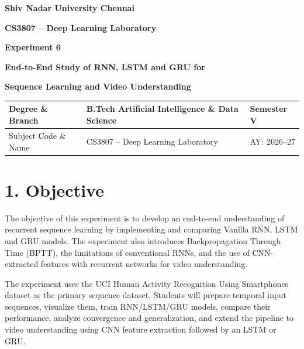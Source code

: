 \documentclass[10pt]{article}
\begin{document}

\begin{center}

{\large\textbf{Shiv Nadar University Chennai}}

\vspace{2mm}

{\normalsize\textbf{CS3807 -- Deep Learning Laboratory}}

\vspace{2mm}

{\large\textbf{Experiment 6}}

\vspace{1mm}

{\normalsize\textbf{End-to-End Study of RNN, LSTM and GRU for}}

{\normalsize\textbf{Sequence Learning and Video Understanding}}

\end{center}

\vspace{3mm}

\begin{tabular}{|p{3.4cm}|p{9.0cm}|p{1.4cm}|}
\hline
Degree \& Branch &
B.Tech Artificial Intelligence \& Data Science &
Semester V\\
\hline
Subject Code \& Name &
CS3807 -- Deep Learning Laboratory &
AY: 2026--27\\
\hline
\end{tabular}

\section*{1. Objective}

The objective of this experiment is to develop an end-to-end understanding of
recurrent sequence learning by implementing and comparing Vanilla RNN, LSTM
and GRU models. The experiment also introduces Backpropagation Through Time
(BPTT), the limitations of conventional RNNs, and the use of CNN-extracted
features with recurrent networks for video understanding.

The experiment uses the UCI Human Activity Recognition Using Smartphones
dataset as the primary sequence dataset. Students will prepare temporal input
sequences, visualize them, train RNN/LSTM/GRU models, compare their
performance, analyze convergence and generalization, and extend the pipeline
to video understanding using CNN feature extraction followed by an LSTM or GRU.
\end{document}
